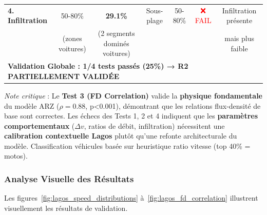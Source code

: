 \begin{table}[htbp]
{\begin{tabular}{lcccccc}
            \midrule
            \textbf{4. Infiltration}         & 50-80\%                                        & \textbf{29.1\%}                                    & Sous-plage      & 50-80\%        & \textcolor{red}{❌ FAIL}            & Infiltration présente      \\
                                             & (zones voitures)                               & (2 segments dominés voitures)                      &                 &                &                                    & mais plus faible           \\
            \midrule
            \multicolumn{7}{l}{\textbf{Validation Globale : 1/4 tests passés (25\%) → R2 PARTIELLEMENT VALIDÉE}}                                                                                                                                        \\
            \bottomrule
        \end{tabular}
    }

    \vspace{0.3cm}
    \footnotesize{\textit{Note critique} : Le \textbf{Test 3 (FD Correlation)} valide la \textbf{physique fondamentale} du modèle ARZ ($\rho=0.88$, p<0.001),
        démontrant que les relations flux-densité de base sont correctes. Les échecs des Tests 1, 2 et 4 indiquent que les
        \textbf{paramètres comportementaux} ($\Delta v$, ratios de débit, infiltration) nécessitent une \textbf{calibration contextuelle Lagos}
        plutôt qu'une refonte architecturale du modèle. Classification véhicules basée sur heuristique ratio vitesse (top 40\% = motos).}
\end{table}

\subsubsection{Analyse Visuelle des Résultats}
\label{subsec:analyse_visuelle_lagos}

Les figures~\ref{fig:lagos_speed_distributions} à~\ref{fig:lagos_fd_correlation} illustrent visuellement les résultats de validation.

